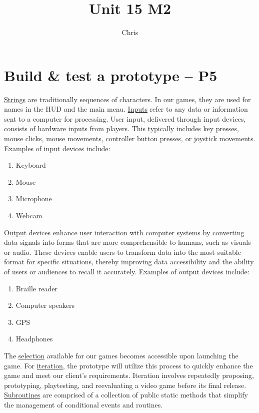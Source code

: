 \documentclass{article}
\begin{document}
\title{Unit 15 M2}
\author{Chris}
\date{}
\maketitle
 

\section{Build \& test a prototype – P5}

\underline{Strings} are traditionally sequences of characters. In our games, they are used for names in the HUD and the main menu. \underline{Inputs} refer to any data or information sent to a computer for processing. User input, delivered through input devices, consists of hardware inputs from players. This typically includes key presses, mouse clicks, mouse movements, controller button presses, or joystick movements. Examples of input devices include:
\begin{enumerate}
	\item Keyboard
	\item Mouse
	\item Microphone
	\item Webcam
\end{enumerate}
\underline{Output} devices enhance user interaction with computer systems by converting data signals into forms that are more comprehensible to humans, such as visuals or audio. These devices enable users to transform data into the most suitable format for specific situations, thereby improving data accessibility and the ability of users or audiences to recall it accurately. Examples of output devices include:
\begin{enumerate}
	\item Braille reader
	\item Computer speakers
	\item GPS
	\item Headphones
\end{enumerate}
The \underline{selection} available for our games becomes accessible upon launching the game. For \underline{iteration}, the prototype will utilize this process to quickly enhance the game and meet our client's requirements. Iteration involves repeatedly proposing, prototyping, playtesting, and reevaluating a video game before its final release. \underline{Subroutines} are comprised of a collection of public static methods that simplify the management of conditional events and routines. \newline
\end{document}
